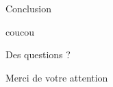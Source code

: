 \begin{frame}{Conclusion}

coucou

\end{frame}

\begin{frame}{Des questions ?}

Merci de votre attention

\end{frame}
